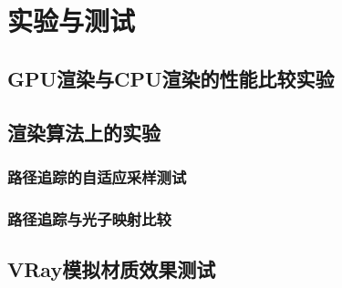 \chapter{实验与测试}
\label{cha:evaluations}

\section{GPU渲染与CPU渲染的性能比较实验}

\section{渲染算法上的实验}
\subsection{路径追踪的自适应采样测试}
\subsection{路径追踪与光子映射比较}

\section{VRay模拟材质效果测试}